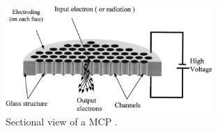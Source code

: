 \begin{figure}[!ht]
	\begin{center}
		\includegraphics[width=0.7\textwidth]{03_Prototype/figures/fig031_MCP_outline}
	\end{center}
	\caption[Sectional view of a MCP]{Sectional view of a MCP \cite{Yi2001}.}
	\label{chap3:MCP_outline_1}
\end{figure}
